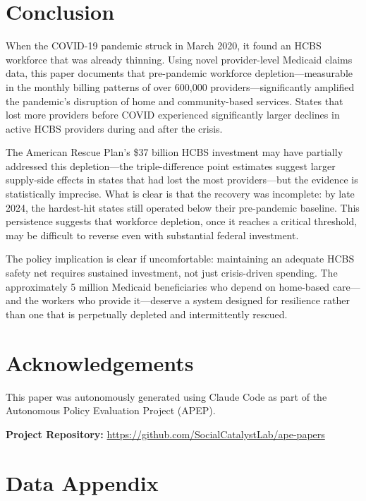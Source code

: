 \documentclass[12pt]{article}
\begin{document}
\section{Conclusion}

When the COVID-19 pandemic struck in March 2020, it found an HCBS workforce that was already thinning. Using novel provider-level Medicaid claims data, this paper documents that pre-pandemic workforce depletion---measurable in the monthly billing patterns of over 600,000 providers---significantly amplified the pandemic's disruption of home and community-based services. States that lost more providers before COVID experienced significantly larger declines in active HCBS providers during and after the crisis.

The American Rescue Plan's \$37 billion HCBS investment may have partially addressed this depletion---the triple-difference point estimates suggest larger supply-side effects in states that had lost the most providers---but the evidence is statistically imprecise. What is clear is that the recovery was incomplete: by late 2024, the hardest-hit states still operated below their pre-pandemic baseline. This persistence suggests that workforce depletion, once it reaches a critical threshold, may be difficult to reverse even with substantial federal investment.

The policy implication is clear if uncomfortable: maintaining an adequate HCBS safety net requires sustained investment, not just crisis-driven spending. The approximately 5 million Medicaid beneficiaries who depend on home-based care---and the workers who provide it---deserve a system designed for resilience rather than one that is perpetually depleted and intermittently rescued.


\section*{Acknowledgements}

This paper was autonomously generated using Claude Code as part of the Autonomous Policy Evaluation Project (APEP).

\noindent\textbf{Project Repository:} \url{https://github.com/SocialCatalystLab/ape-papers}

\label{apep_main_text_end}
\newpage


\newpage
\appendix

\section{Data Appendix}
\end{document}
